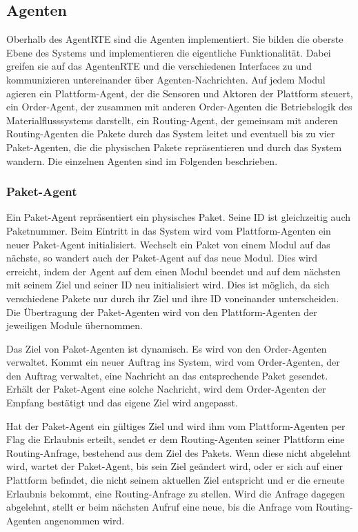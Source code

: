 \subsection{Agenten}
\label{sec:FlowAgents}
Oberhalb des AgentRTE sind die Agenten implementiert. Sie bilden die oberste Ebene des Systems und implementieren die eigentliche Funktionalität. Dabei greifen sie auf das AgentenRTE und die verschiedenen Interfaces zu und kommunizieren untereinander über Agenten-Nachrichten. Auf jedem Modul agieren ein Plattform-Agent, der die Sensoren und Aktoren der Plattform steuert, ein Order-Agent, der zusammen mit anderen Order-Agenten die Betriebslogik des Materialflusssystems darstellt, ein Routing-Agent, der gemeinsam mit anderen Routing-Agenten die Pakete durch das System leitet und eventuell bis zu vier Paket-Agenten, die die physischen Pakete repräsentieren und durch das System wandern. Die einzelnen Agenten sind im Folgenden beschrieben.
\subsubsection{Paket-Agent}
Ein Paket-Agent repräsentiert ein physisches Paket. Seine ID ist gleichzeitig auch Paketnummer. Beim Eintritt in das System wird vom Plattform-Agenten ein neuer Paket-Agent initialisiert. Wechselt ein Paket von einem Modul auf das nächste, so wandert auch der Paket-Agent auf das neue Modul. Dies wird erreicht, indem der Agent auf dem einen Modul beendet und auf dem nächsten mit seinem Ziel und seiner ID neu initialisiert wird. Dies ist möglich, da sich verschiedene Pakete nur durch ihr Ziel und ihre ID voneinander unterscheiden. Die Übertragung der Paket-Agenten wird von den Plattform-Agenten der jeweiligen Module übernommen.

Das Ziel von Paket-Agenten ist dynamisch. Es wird von den Order-Agenten verwaltet. Kommt ein neuer Auftrag ins System, wird vom Order-Agenten, der den Auftrag verwaltet, eine Nachricht an das entsprechende Paket gesendet. Erhält der Paket-Agent eine solche Nachricht, wird dem Order-Agenten der Empfang bestätigt und das eigene Ziel wird angepasst.

Hat der Paket-Agent ein gültiges Ziel und wird ihm vom Plattform-Agenten per Flag die Erlaubnis erteilt, sendet er dem Routing-Agenten seiner Plattform eine Routing-Anfrage, bestehend aus dem Ziel des Pakets. Wenn diese nicht abgelehnt wird, wartet der Paket-Agent, bis sein Ziel geändert wird, oder er sich auf einer Plattform befindet, die nicht seinem aktuellen Ziel entspricht und er die erneute Erlaubnis bekommt, eine Routing-Anfrage zu stellen. Wird die Anfrage dagegen abgelehnt, stellt er beim nächsten Aufruf eine neue, bis die Anfrage vom Routing-Agenten angenommen wird.

